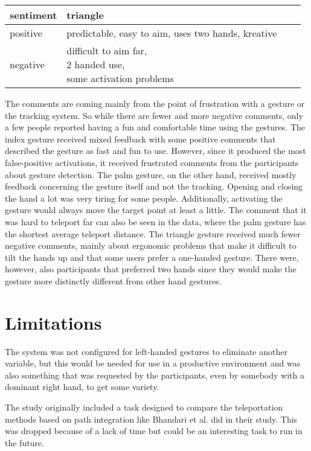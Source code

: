 \begin{table}[]
\begin{tabular}{llll}
\hline
sentiment &
    triangle \\ \hline
\multicolumn{1}{|l|}{positive} &
    \multicolumn{1}{l|}{predictable, easy to aim, uses two hands, kreative} \\ \hline
negative &
    \makecell{difficult to aim far,\\ 2 handed use,\\ some activation problems} \\ \hline
\end{tabular}%
\label{tbl:interview3}
\end{table}

The comments are coming mainly from the point of frustration with a gesture or the tracking system. So while there are fewer and more negative comments, only a few people reported having a fun and comfortable time using the gestures. The index gesture received mixed feedback with some positive comments that described the gesture as fast and fun to use. However, since it produced the most false-positive activations, it received frustrated comments from the participants about gesture detection. The palm gesture, on the other hand, received mostly feedback concerning the gesture itself and not the tracking. Opening and closing the hand a lot was very tiring for some people. Additionally, activating the gesture would always move the target point at least a little. The comment that it was hard to teleport far can also be seen in the data, where the palm gesture has the shortest average teleport distance. The triangle gesture received much fewer negative comments, mainly about ergonomic problems that make it difficult to tilt the hands up and that some users prefer a one-handed gesture. There were, however, also participants that preferred two hands since they would make the gesture more distinctly different from other hand gestures. 


\section{Limitations}
The system was not configured for left-handed gestures to eliminate another variable, but this would be needed for use in a productive environment and was also something that was requested by the participants, even by somebody with a dominant right hand, to get some variety. 

The study originally included a task designed to compare the teleportation methods based on path integration like Bhandari et al. \cite{Bhandari} did in their study. This was dropped because of a lack of time but could be an interesting task to run in the future.

